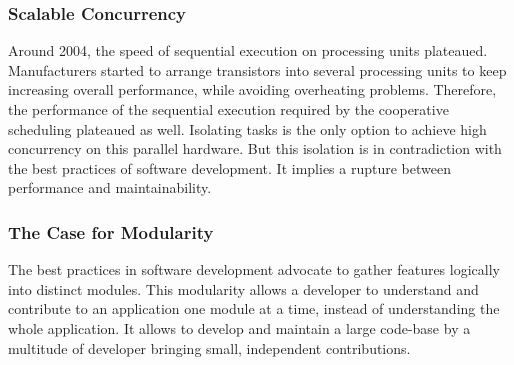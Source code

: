 \subsubsection{Scalable Concurrency}



Around 2004, the speed of sequential execution on processing units plateaued.
Manufacturers started to arrange transistors into several processing units to keep increasing overall performance, while avoiding overheating problems.
Therefore, the performance of the sequential execution required by the cooperative scheduling plateaued as well.
Isolating tasks is the only option to achieve high concurrency on this parallel hardware.
But this isolation is in contradiction with the best practices of software development.
It implies a rupture between performance and maintainability.

\subsubsection{The Case for Modularity}

The best practices in software development advocate to gather features logically into distinct modules.
This modularity allows a developer to understand and contribute to an application one module at a time, instead of understanding the whole application.
It allows to develop and maintain a large code-base by a multitude of developer bringing small, independent contributions.



